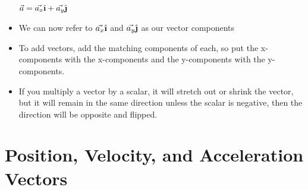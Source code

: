 \documentclass[openany]{book}
\newcommand{\ihat}{\hat{\textbf{\i}}}
\newcommand{\jhat}{\hat{\textbf{\j}}}
\begin{document}
\begin{itemize}
    \\
    $\vec{a} = \vec{a_x}{\ihat} + \vec{a_y}{\jhat}$
    \item We can now refer to $\vec{a_x}{\ihat}$ and $\vec{a_y}{\jhat}$ as our vector components
    \item To add vectors, add the matching components of each, so put the x-components with the x-components and the y-components with the y-components.
    \item If you multiply a vector by a scalar, it will stretch out or shrink the vector, but it will remain in the same direction unless the scalar is negative, then the direction will be opposite and flipped.
\end{itemize}
\section{Position, Velocity, and Acceleration Vectors}
\end{document}
